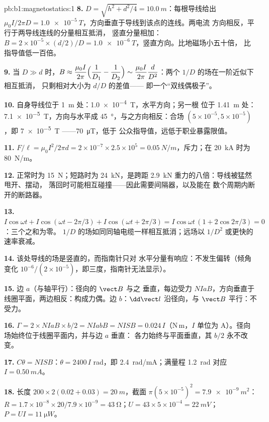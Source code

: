 \begin{solution}{pb:b1:magnetostatics:1}
\textbf{8.} $D = \sqrt{h^2 + d^2/4} = \qty{10.0}{m}$：每根导线给出 $\mu_0I/2\pi D =
\qty{1.0e-5}{T}$，方向垂直于导线到该点的连线。两电流
方向相反，平行于两导线连线的分量相互抵消，
竖直分量相加：$B = 2 \times 10^{-5} \times
(d/2)/D = \qty{1.0e-6}{T}$，竖直方向。比地磁场小五十倍，
比指导值低一百倍。

\textbf{9.} 当 $D \gg d$ 时，$B \approx \dfrac{\mu_0I}{2\pi}\Bigl(\dfrac1{D_1} - \dfrac1{D_2}\Bigr)
\sim \dfrac{\mu_0I}{2\pi}\dfrac{d}{D^2}$：两个 $1/D$ 的场在一阶近似下相互抵消，
只剩相对大小为 $d/D$ 的差值——
即一个“双线偶极子”。

\textbf{10.} 自身导线位于 \qty{1}{m} 处：\qty{1.0e-4}{T}，水平方向；另一根
位于 \qty{1.41}{m} 处：\qty{7.1e-5}{T}，方向与水平成 \qty{45}{\degree}，与之方向相反：合场
$(5 \times 10^{-5}, 5 \times 10^{-5})$，即 \qty{7e-5}{T} ——\qty{70}{\micro T}，低于
公众指导值，远低于职业暴露限值。

\textbf{11.} $F/\ell = \mu_0I^2/2\pi d = 2 \times 10^{-7} \times 2.5 \times 10^5 =
\qty{0.05}{N/m}$，斥力；在 \qty{20}{kA} 时为 \qty{80}{N/m}。

\textbf{12.} 正常时为 \qty{15}{N}；短路时为 \qty{24}{kN}，是跨距
\qty{2.9}{kN} 重力的八倍：导线被猛然甩开、摆动，
落回时可能相互碰撞——因此需要间隔器，以及能在
数个周期内断开的断路器。

\textbf{13.} $I\cos\omega t + I\cos(\omega t - 2\pi/3) + I\cos(\omega t + 2\pi/3) =
I\cos\omega t\,(1 + 2\cos2\pi/3) = 0$：三个之和为零。
$1/D$ 的场如同同轴电缆一样相互抵消；远场以 $1/D^2$
或更快的速率衰减。

\textbf{14.} 该处导线的场是竖直的，而指南针只对
水平分量有响应：不发生偏转（倾角变化
$10^{-6}/(2 \times 10^{-5})$，即三度，指南针无法显示）。

\textbf{15.} 边 $a$（与轴平行）：径向的 $\vect B$ 与之
垂直，每边受力 $NIaB$，方向垂直于
线圈平面，两边相反：构成力偶。边 $b$：$\dd\vect l$
沿径向，与 $\vect B$ 平行：不受力。

\textbf{16.} $\Gamma = 2 \times NIaB \times b/2 = NIabB = NISB = 0.024\,I$（N\,m，$I$
单位为 A）。径向场始终位于线圈平面内，并与边 $a$ 垂直：
各力始终与平面垂直，其
$b/2$ 永不改变。

\textbf{17.} $C\theta = NISB$：$\theta = 2400\,I$ rad，即 \qty{2.4}{rad/mA}；满量程
\qty{1.2}{rad} 对应 $I = \qty{0.50}{mA}$。

\textbf{18.} 长度 $200 \times 2(0.02 + 0.03) = \qty{20}{m}$，截面 $\pi(5 \times
10^{-5})^2 = \qty{7.9e-9}{m^2}$：$R = 1.7 \times 10^{-8} \times 20/7.9 \times 10^{-9} =
\qty{43}{\ohm}$；$U = 43 \times 5 \times 10^{-4} = \qty{22}{mV}$；$P = UI = \qty{11}{\micro W}$。


\end{solution}
